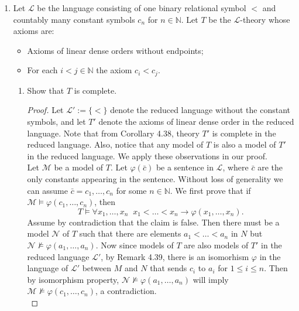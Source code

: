 \documentclass{article}
\begin{document}
\begin{enumerate}[label={\bf Q\arabic*:}]
\begin{enumerate}
      \item Is $T$ complete?
        \begin{proof}
          Yes. $T$ has no finite models and is $\omega$-categorical, hence
          by Vaught's test it is complete.
        \end{proof}
    \end{enumerate}

  \item Let $\mathcal{L}$ be the language consisting of one binary
    relational symbol $<$ and countably many constant symbols $c_n$ for
    $n\in\mathbb{N}$. Let $T$ be the $\mathcal{L}$-theory whose axioms are:
    \begin{itemize}
      \item Axioms of linear dense orders without endpoints;
      \item For each $i<j\in\mathbb{N}$ the axiom $c_i<c_j$.
    \end{itemize}

    \begin{enumerate}
      \item Show that $T$ is complete.
        \begin{proof}
          Let $\mathcal{L}':=\{<\}$ denote the reduced language without the
          constant symbols, and let $T'$ denote the axioms of linear dense
          order in the reduced language. Note that from Corollary 4.38,
          theory $T'$ is complete in the reduced language. Also, notice
          that any model of $T$ is also a model of $T'$ in the reduced
          language. We apply these observations in our proof. \\

          Let $\mathcal{M}$ be a model of $T$. Let $\varphi(\bar{c})$ be a
          sentence in $\mathcal{L}$, where $\bar{c}$ are the only
          constants appearing in the sentence. Without loss of generality
          we can assume $\bar{c}=c_1,\ldots,c_n$ for some $n\in\mathbb{N}$.
          We first prove that if
          $\mathcal{M}\models\varphi(c_1,\ldots,c_n)$, then
          \begin{equation*}
            T\models\forall x_1,\ldots,x_n\;\; x_1<\ldots<
            x_n\rightarrow\varphi(x_1,\ldots,x_n).
          \end{equation*}
          Assume by contradiction that the claim is false. Then there must
          be a model $\mathcal{N}$ of $T$ such that there are elements
          $a_1<\ldots<a_n$ in $N$ but
          $\mathcal{N}\not\models\varphi(a_1,\ldots,a_n)$. Now since models
          of $T$ are also models of $T'$ in the reduced language
          $\mathcal{L}'$, by Remark 4.39, there is an isomorhism $\varphi$
          in the language of $\mathcal{L}'$ between $M$ and $N$ that sends
          $c_i$ to $a_i$ for $1\leq i\leq n$. Then by isomorphism property,
          $\mathcal{N}\not\models\varphi(a_1,\ldots,a_n)$ will imply
          $\mathcal{M}\not\models\varphi(c_1,\ldots,c_n)$, a contradiction.
          \\


\end{proof}
\end{enumerate}
\end{enumerate}
\end{document}
